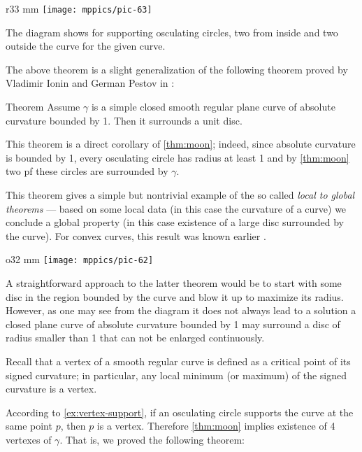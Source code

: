 \begin{wrapfigure}{r}{33 mm}
\vskip4mm
\centering
\texttt{[image: mppics/pic-63]}
\vskip0mm
\end{wrapfigure}

The diagram shows for supporting osculating circles, two from inside and two outside the curve for the given curve.

The above theorem is a slight generalization of the following theorem proved by Vladimir Ionin and German Pestov in \cite{pestov-ionin}:

\begin{thm}{Theorem}\label{thm:moon-orginal}
Assume $\gamma$ is a simple closed smooth regular plane curve of absolute curvature bounded by 1.
Then it surrounds a unit disc.
\end{thm}

This theorem is a direct corollary of \ref{thm:moon};
indeed, since absolute curvature is bounded by 1, every osculating circle has radius at least 1 and by \ref{thm:moon} two pf these circles are surrounded by $\gamma$.

This theorem gives a simple but nontrivial example of the so called \emph{local to global theorems} --- based on some local data (in this case the curvature of a curve) we conclude a global property (in this case existence of a large disc surrounded by the curve).
For convex curves, this result was known earlier \cite[\S 24]{blaschke}.

\begin{wrapfigure}{o}{32 mm}
\vskip-0mm
\centering
\texttt{[image: mppics/pic-62]}
\vskip0mm
\end{wrapfigure}

A straightforward approach to the latter theorem would be to start with some disc in the region bounded by the curve and blow it up to maximize its radius.
However, as one may see from the diagram it does not always lead to a solution a closed plane curve of absolute curvature bounded by 1 may surround a disc of radius smaller than 1 that can not be enlarged continuously.  

Recall that a vertex of a smooth regular curve is defined as a critical point of its signed curvature;
in particular, any local minimum (or maximum) of the signed curvature is a vertex.

According to \ref{ex:vertex-support}, if an osculating circle supports the curve at the same point $p$, then $p$ is a vertex.
Therefore \ref{thm:moon} implies existence of 4 vertexes of $\gamma$.
That is, we proved the following theorem:

